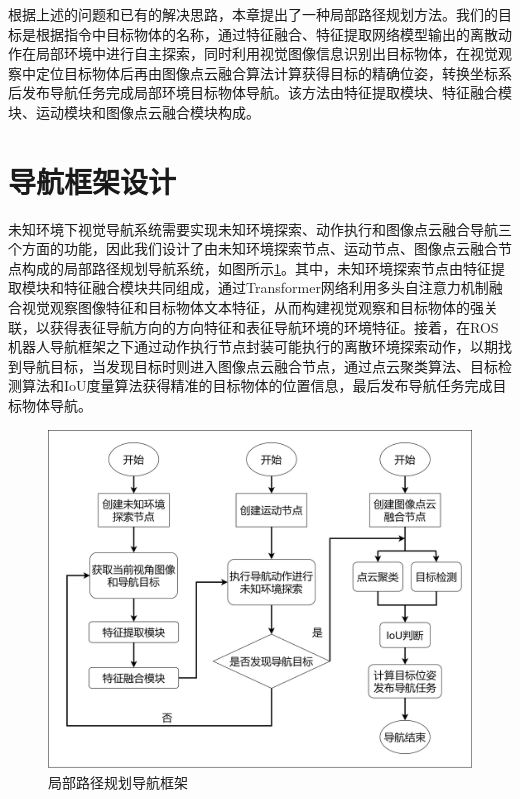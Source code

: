 根据上述的问题和已有的解决思路，本章提出了一种局部路径规划方法。我们的目标是根据指令中目标物体的名称，通过特征融合、特征提取网络模型输出的离散动作在局部环境中进行自主探索，同时利用视觉图像信息识别出目标物体，在视觉观察中定位目标物体后再由图像点云融合算法计算获得目标的精确位姿，转换坐标系后发布导航任务完成局部环境目标物体导航。该方法由特征提取模块、特征融合模块、运动模块和图像点云融合模块构成。


\section{导航框架设计}
未知环境下视觉导航系统需要实现未知环境探索、动作执行和图像点云融合导航三个方面的功能，因此我们设计了由未知环境探索节点、运动节点、图像点云融合节点构成的局部路径规划导航系统，如图所示\ref{局部路径规划导航方法}。其中，未知环境探索节点由特征提取模块和特征融合模块共同组成，通过Transformer网络利用多头自注意力机制融合视觉观察图像特征和目标物体文本特征，从而构建视觉观察和目标物体的强关联，以获得表征导航方向的方向特征和表征导航环境的环境特征。接着，在ROS机器人导航框架之下通过动作执行节点封装可能执行的离散环境探索动作，以期找到导航目标，当发现目标时则进入图像点云融合节点，通过点云聚类算法、目标检测算法和IoU度量算法获得精准的目标物体的位置信息，最后发布导航任务完成目标物体导航。
\begin{figure}[htbp]
    \centering
    \includegraphics[scale=0.08]{Fig/未知环境导航框架.png}
    \caption{\label{局部路径规划导航方法}局部路径规划导航框架}
\end{figure}

